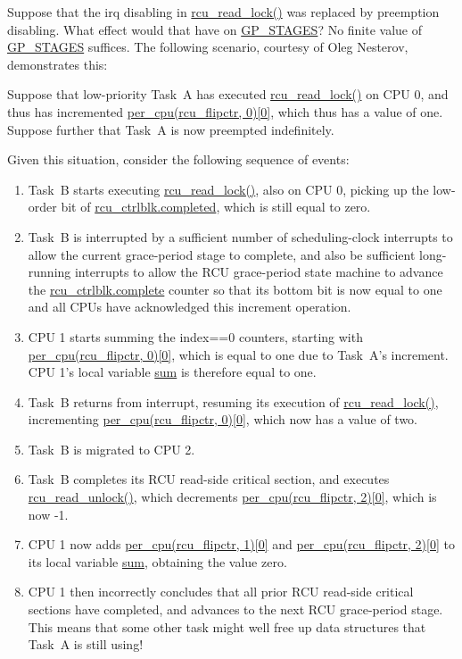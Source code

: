 \QuickQ{}
	Suppose that the irq disabling in
	\url{rcu_read_lock()} was replaced by preemption disabling.
	What effect would that have on \url{GP_STAGES}?
\QuickA{}
	No finite value of \url{GP_STAGES} suffices.
	The following scenario, courtesy of Oleg Nesterov, demonstrates this:

	Suppose that low-priority Task~A has executed
	\url{rcu_read_lock()} on CPU 0,
	and thus has incremented \url{per_cpu(rcu_flipctr, 0)[0]},
	which thus has a value of one.
	Suppose further that Task~A is now preempted indefinitely.

	Given this situation, consider the following sequence of events:
	\begin{enumerate}
	\item	Task~B starts executing \url{rcu_read_lock()}, also on
		CPU 0, picking up the low-order bit of
		\url{rcu_ctrlblk.completed}, which is still equal to zero.
	\item	Task~B is interrupted by a sufficient number of scheduling-clock
		interrupts to allow the current grace-period stage to complete,
		and also be sufficient long-running interrupts to allow the
		RCU grace-period state machine to advance the
		\url{rcu_ctrlblk.complete} counter so that its bottom bit
		is now equal to one and all CPUs have acknowledged this
		increment operation.
	\item	CPU 1 starts summing the index==0 counters, starting with
		\url{per_cpu(rcu_flipctr, 0)[0]}, which is equal to one
		due to Task~A's increment.
		CPU 1's local variable \url{sum} is therefore equal to one.
	\item	Task~B returns from interrupt, resuming its execution of
		\url{rcu_read_lock()}, incrementing
		\url{per_cpu(rcu_flipctr, 0)[0]}, which now has a value
		of two.
	\item	Task~B is migrated to CPU 2.
	\item	Task~B completes its RCU read-side critical section, and
		executes \url{rcu_read_unlock()}, which decrements
		\url{per_cpu(rcu_flipctr, 2)[0]}, which is now -1.
	\item	CPU 1 now adds \url{per_cpu(rcu_flipctr, 1)[0]} and
		\url{per_cpu(rcu_flipctr, 2)[0]} to its
		local variable \url{sum}, obtaining the value zero.
	\item	CPU 1 then incorrectly concludes that all prior RCU read-side
		critical sections have completed, and advances to the next
		RCU grace-period stage.
		This means that some other task might well free up data
		structures that Task~A is still using!
	\end{enumerate}

